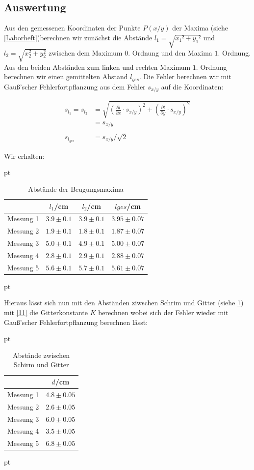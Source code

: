 \documentclass[12pt]{article}
\newcommand{\del}[2][]{\frac{\partial #1}{\partial #2}}
\begin{document}
\subsection{Auswertung}

Aus den gemessenen Koordinaten der Punkte $P(x/y)$ der Maxima (siehe \ref{Laborheft})berechnen wir zunächst die Abstände $l_1 = \sqrt{x_1²+y_1²}$ und $l_2= \sqrt{x_2^2+y_2^2} $ zwischen dem Maximum $0.$ Ordnung und den Maxima $1.$ Ordnung. Aus den beiden Abständen zum linken und rechten Maximum $1.$ Ordnung berechnen wir einen gemittelten Abstand $l_{ges}$. Die Fehler berechnen wir mit Gauß'scher Fehlerfortpflanzung aus dem Fehler $s_{x/y}$ auf die Koordinaten:

\begin{align*}
s_{l_1} = s_{l_2} &= \sqrt{\left(\del[l]{x}\cdot s_{x/y}\right)^2+\left(\del[l]{y}\cdot s_{x/y}\right)^2}\\
&= s_{x/y}\\
\  \\
s_{l_{ges}} &= s_{x/y}/\sqrt{2}
\end{align*}

Wir erhalten:

  pt
 \begin{table}[h!]
 {\centering{}
\begin{tabular}{c||c|c|c}
 					& $l_1$/cm 	& $l_2$/cm & $l{ges}$/cm 	\\ \hline\hline
Messung 1		& $3.9 \pm 0.1$ 	&  $3.9 \pm 0.1$    	&  $3.95 \pm 0.07$ \\ \hline 
Messung 2	&	 $1.9 \pm 0.1$ 	   	&  $1.8 \pm 0.1$  	&  $1.87 \pm 0.07$  \\ \hline
Messung 3      	&  $5.0 \pm 0.1$  	&  $4.9 \pm 0.1$  &  $5.00 \pm 0.07$  \\ \hline
Messung 4    & $2.8 \pm 0.1$ & $2.9 \pm 0.1$ &   $2.88 \pm 0.07$        \\ \hline                                           
Messung 5  & $5.6 \pm 0.1$  & $5.7 \pm 0.1$ & $5.61 \pm 0.07$
 \end{tabular}
 \caption{Abstände der Beugungsmaxima}}
\end{table}
 pt

Hieraus lässt sich nun mit den Abständen ziwschen Schrim und Gitter (siehe \ref{Tabelle}) mit \ref{11} die Gitterkonstante $K$ berechnen wobei sich der Fehler wieder mit Gauß'scher Fehlerfortpflanzung berechnen lässt:

  pt
 \begin{table}[h!]
 {\centering{}
\begin{tabular}{c|c}
 					& $d$/cm 		\\ \hline\hline
Messung 1		& $4.8 \pm 0.05$ 	 \\ \hline 
Messung 2	&	 $2.6 \pm 0.05$ 	   	  \\ \hline
Messung 3      	&  $6.0 \pm 0.05$    \\ \hline
Messung 4    & $3.5 \pm 0.05$         \\ \hline                                           
Messung 5  & $6.8 \pm 0.05$  
 \end{tabular}
 \caption{Abstände zwischen Schirm und Gitter }\label{Tabelle}}
\end{table}
 pt
\end{document}
